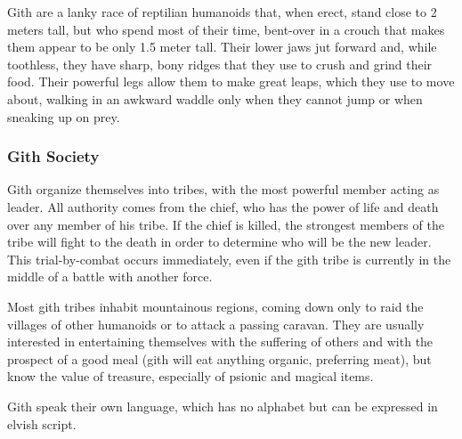 Gith are a lanky race of reptilian humanoids that, when erect, stand close to 2 meters tall, but who spend most of their time, bent-over in a crouch that makes them appear to be only 1.5 meter tall. Their lower jaws jut forward and, while toothless, they have sharp, bony ridges that they use to crush and grind their food. Their powerful legs allow them to make great leaps, which they use to move about, walking in an awkward waddle only when they cannot jump or when sneaking up on prey.

\subsubsection{Gith Society}
Gith organize themselves into tribes, with the most powerful member acting as leader. All authority comes from the chief, who has the power of life and death over any member of his tribe. If the chief is killed, the strongest members of the tribe will fight to the death in order to determine who will be the new leader. This trial-by-combat occurs immediately, even if the gith tribe is currently in the middle of a battle with another force.

Most gith tribes inhabit mountainous regions, coming down only to raid the villages of other humanoids or to attack a passing caravan. They are usually interested in entertaining themselves with the suffering of others and with the prospect of a good meal (gith will eat anything organic, preferring meat), but know the value of treasure, especially of psionic and magical items.

Gith speak their own language, which has no alphabet but can be expressed in elvish script.


